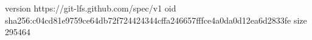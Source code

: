 version https://git-lfs.github.com/spec/v1
oid sha256:c04cd81e9759ce64db72f724424344cffa246657fffce4a0da0d12ea6d2833fe
size 295464
